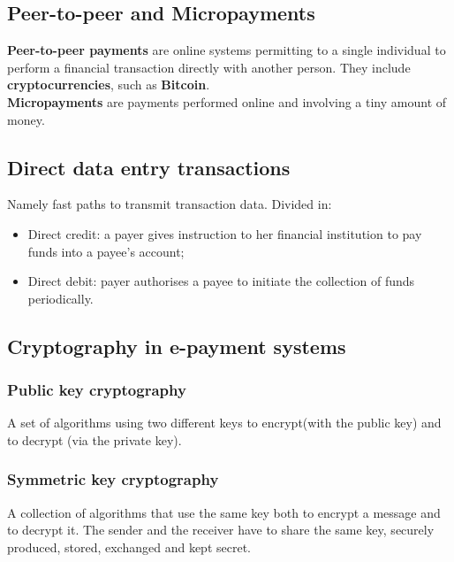 \documentclass[a4paper, 10pt, titlepage]{article}
\begin{document}
\subsection{Peer-to-peer and Micropayments}
\textbf{Peer-to-peer payments} are online systems permitting to a single individual to perform a financial transaction directly with another person. They include \textbf{cryptocurrencies}, such as \textbf{Bitcoin}. \medskip\\
\textbf{Micropayments} are payments performed online and involving a tiny amount of money.

\subsection*{Direct data entry transactions} 
Namely fast paths to transmit transaction data. Divided in:
\begin{itemize}
\item Direct credit: a payer gives instruction to her financial institution to pay funds into a payee's account;
\item Direct debit: payer authorises a payee to initiate the collection of funds periodically.
\end{itemize}

\subsection{Cryptography in e-payment systems}
\subsubsection*{Public key cryptography}
A set of algorithms using two different keys to encrypt(with the public key) and to decrypt (via the private key).
\subsubsection*{Symmetric key cryptography}
A collection of algorithms that use the same key both to encrypt a message and to decrypt it. The sender and the receiver have to share the same key, securely produced, stored, exchanged and kept secret.
\end{document}
